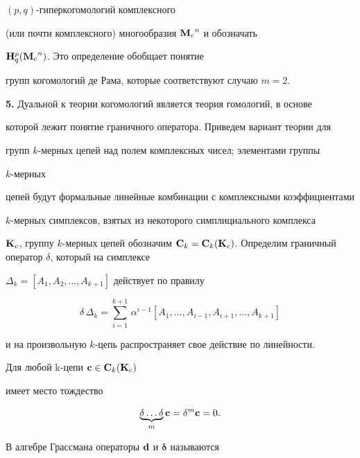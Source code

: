 $(p,q)$-гиперкогомологий комплексного


(или почти комплексного) многообразия ${\bold M_c}^n$ и обозначать


${\bold H}_q^p({\bold M_c}^n)$. Это определение обобщает понятие


групп когомологий де Рама, которые соответствуют случаю $m=2$.


\medskip





{\bf 5.} Дуальной к теории когомологий является теория гомологий, в основе


которой лежит понятие граничного оператора. Приведем вариант теории для


групп $k$-мерных цепей над полем комплексных чисел; элементами группы


$k$-мерных


цепей будут формальные линейные комбинации с комплексными коэффициентами


$k$-мерных симплексов, взятых из некоторого симплициального комплекса


${\bold K_c}$, группу $k$-мерных цепей обозначим ${\bold C}_k={\bold C}_k


({\bold K_c})$. Определим граничный оператор  $\delta$, который на симплексе


$ \Delta_k = [A_1,A_2,\dotsc,A_{k+1}] $ действует по правилу


$$


\delta\,\Delta_k = \sum_{i=1}^{k+1}\, \alpha^{i-1}[A_1,\dotsc,A_{i-1},


A_{i+1},\dotsc,A_{k+1}]


$$


и на произвольную $k$-цепь распространяет свое действие по линейности.





\begin{thm} Для любой k-цепи ${\bold c}\in {\bold C}_k({\bold K_c})$


имеет место тождество


$$


\underbrace{\delta\dotsc\delta}_m {\bold c}=\delta^m{\bold c}=0.


$$


\end{thm}





В алгебре Грассмана операторы ${\bold d}$ и ${\boldsymbol \delta}$ называются


